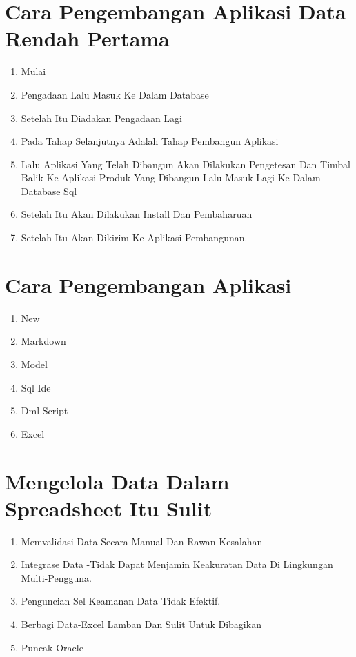 \documentclass{article}
\begin{document}
\section{Cara Pengembangan Aplikasi Data Rendah Pertama}
\begin{enumerate}
    \item Mulai
    \item Pengadaan Lalu Masuk Ke Dalam Database
    \item Setelah Itu Diadakan Pengadaan Lagi
    \item Pada Tahap Selanjutnya Adalah Tahap Pembangun Aplikasi
    \item Lalu Aplikasi Yang Telah Dibangun Akan Dilakukan Pengetesan Dan Timbal Balik Ke Aplikasi Produk Yang Dibangun Lalu Masuk Lagi Ke Dalam Database Sql
    \item Setelah Itu Akan Dilakukan Install Dan Pembaharuan
    \item Setelah Itu Akan Dikirim Ke Aplikasi Pembangunan.
\end{enumerate}
\section{Cara Pengembangan Aplikasi}
\begin{enumerate}
    \item New
    \item Markdown
    \item Model
    \item Sql Ide
    \item Dml Script
    \item Excel

\end{enumerate}

\section{Mengelola Data Dalam Spreadsheet Itu Sulit}
\begin{enumerate}
    \item Memvalidasi Data Secara Manual Dan Rawan Kesalahan
    \item Integrase Data -Tidak Dapat Menjamin Keakuratan Data Di Lingkungan Multi-Pengguna.
    \item Penguncian Sel Keamanan Data Tidak Efektif.
    \item Berbagi Data-Excel Lamban Dan Sulit Untuk Dibagikan
    \item Puncak Oracle
    
\end{enumerate}
\end{document}
